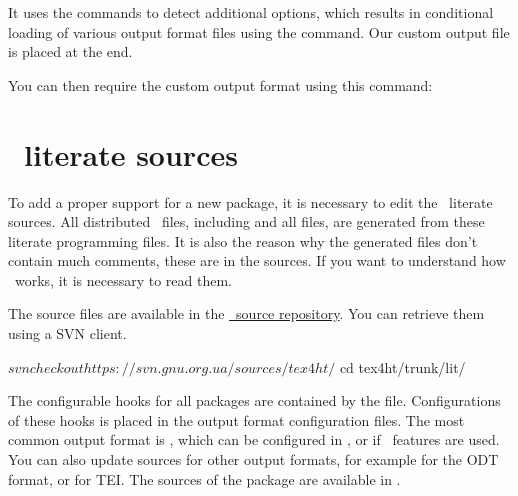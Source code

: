 It uses the  commands to detect additional options, which results 
in conditional loading of various output format files using the  command. 
Our custom output file  is placed at the end.

You can then require the custom output format using this command:









\section{\texfourht\ literate sources}

To add a proper support for a new package, it is necessary to edit the 
\texfourht\ literate sources. All distributed \texfourht\ files, including
 and all  files, are generated from these literate
programming files. It is also the reason why the generated files don't contain
much comments, these are in the sources. If you want to understand
how \texfourht\ works, it is necessary to read them.

The source files are available in the \href{https://puszcza.gnu.org.ua/projects/tex4ht/}{\texfourht\ source repository}.
You can retrieve them using a SVN client. 

\begin{shellcommand}
$ svn checkout https://svn.gnu.org.ua/sources/tex4ht/
$ cd tex4ht/trunk/lit/
\end{shellcommand}


The configurable hooks for all packages are contained by the  file.
Configurations of these hooks is placed in the output format configuration files.
The most common output format is \HTML, which can be configured in , or 
 if \HTMLV\ features are used. You can also update sources for other output
formats, for example  for the ODT format, or  for TEI.
The sources of the  package are available in .

